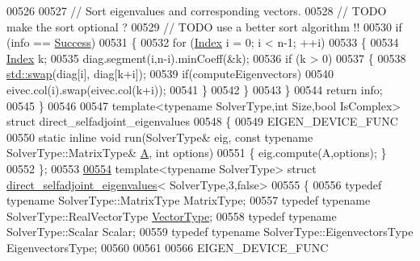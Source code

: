 \begin{DoxyCode}
00526 
00527   \textcolor{comment}{// Sort eigenvalues and corresponding vectors.}
00528   \textcolor{comment}{// TODO make the sort optional ?}
00529   \textcolor{comment}{// TODO use a better sort algorithm !!}
00530   \textcolor{keywordflow}{if} (info == \hyperlink{group__enums_gga85fad7b87587764e5cf6b513a9e0ee5ea52581b035f4b59c203b8ff999ef5fcea}{Success})
00531   \{
00532     \textcolor{keywordflow}{for} (\hyperlink{group___eigenvalues___module_a8a59ab7734b6eae2754fd78bc7c3a360}{Index} i = 0; i < n-1; ++i)
00533     \{
00534       \hyperlink{group___eigenvalues___module_a8a59ab7734b6eae2754fd78bc7c3a360}{Index} k;
00535       diag.segment(i,n-i).minCoeff(&k);
00536       \textcolor{keywordflow}{if} (k > 0)
00537       \{
00538         \hyperlink{endian_8c_a3ca5ecd34b04d6a243c054ac3a57f68d}{std::swap}(diag[i], diag[k+i]);
00539         \textcolor{keywordflow}{if}(computeEigenvectors)
00540           eivec.col(i).swap(eivec.col(k+i));
00541       \}
00542     \}
00543   \}
00544   \textcolor{keywordflow}{return} info;
00545 \}
00546   
00547 \textcolor{keyword}{template}<\textcolor{keyword}{typename} SolverType,\textcolor{keywordtype}{int} Size,\textcolor{keywordtype}{bool} IsComplex> \textcolor{keyword}{struct }direct\_selfadjoint\_eigenvalues
00548 \{
00549   EIGEN\_DEVICE\_FUNC
00550   \textcolor{keyword}{static} \textcolor{keyword}{inline} \textcolor{keywordtype}{void} run(SolverType& eig, \textcolor{keyword}{const} \textcolor{keyword}{typename} SolverType::MatrixType& 
      \hyperlink{group___core___module_class_eigen_1_1_matrix}{A}, \textcolor{keywordtype}{int} options)
00551   \{ eig.compute(A,options); \}
00552 \};
00553 
\hyperlink{struct_eigen_1_1internal_1_1direct__selfadjoint__eigenvalues_3_01_solver_type_00_013_00_01false_01_4}{00554} \textcolor{keyword}{template}<\textcolor{keyword}{typename} SolverType> \textcolor{keyword}{struct }\hyperlink{struct_eigen_1_1internal_1_1direct__selfadjoint__eigenvalues}{direct\_selfadjoint\_eigenvalues}<
      SolverType,3,false>
00555 \{
00556   \textcolor{keyword}{typedef} \textcolor{keyword}{typename} SolverType::MatrixType MatrixType;
00557   \textcolor{keyword}{typedef} \textcolor{keyword}{typename} SolverType::RealVectorType \hyperlink{struct_vector_type}{VectorType};
00558   \textcolor{keyword}{typedef} \textcolor{keyword}{typename} SolverType::Scalar Scalar;
00559   \textcolor{keyword}{typedef} \textcolor{keyword}{typename} SolverType::EigenvectorsType EigenvectorsType;
00560   
00561 
00566   EIGEN\_DEVICE\_FUNC

\end{DoxyCode}
